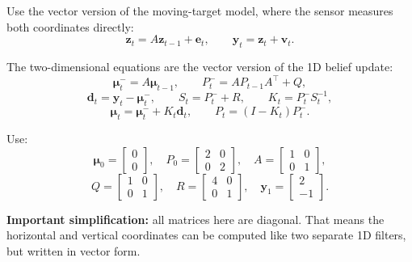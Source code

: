 \documentclass[11pt]{article}
\begin{document}
Use the vector version of the moving-target model, where the sensor measures
both coordinates directly:
\[
\mathbf{z}_t=A\mathbf{z}_{t-1}+\mathbf{e}_t,
\qquad
\mathbf{y}_t=\mathbf{z}_t+\mathbf{v}_t.
\]

The two-dimensional equations are the vector version of the 1D belief update:
\[
\boldsymbol{\mu}_t^- = A\boldsymbol{\mu}_{t-1},
\qquad
P_t^- = AP_{t-1}A^\top+Q,
\]
\[
\mathbf{d}_t = \mathbf{y}_t-\boldsymbol{\mu}_t^-,
\qquad
S_t = P_t^- + R,
\qquad
K_t = P_t^- S_t^{-1},
\]
\[
\boldsymbol{\mu}_t =
\boldsymbol{\mu}_t^- + K_t\mathbf{d}_t,
\qquad
P_t = (I-K_t)P_t^-.
\]

Use:
\[
\boldsymbol{\mu}_0 =
\begin{bmatrix}
0 \\
0
\end{bmatrix},
\quad
P_0 =
\begin{bmatrix}
2 & 0 \\
0 & 2
\end{bmatrix},
\quad
A =
\begin{bmatrix}
1 & 0 \\
0 & 1
\end{bmatrix},
\]
\[
Q =
\begin{bmatrix}
1 & 0 \\
0 & 1
\end{bmatrix},
\quad
R =
\begin{bmatrix}
4 & 0 \\
0 & 1
\end{bmatrix},
\quad
\mathbf{y}_1 =
\begin{bmatrix}
2 \\
-1
\end{bmatrix}.
\]

\textbf{Important simplification:} all matrices here are diagonal. That means
the horizontal and vertical coordinates can be computed like two separate 1D
filters, but written in vector form.
\end{document}
